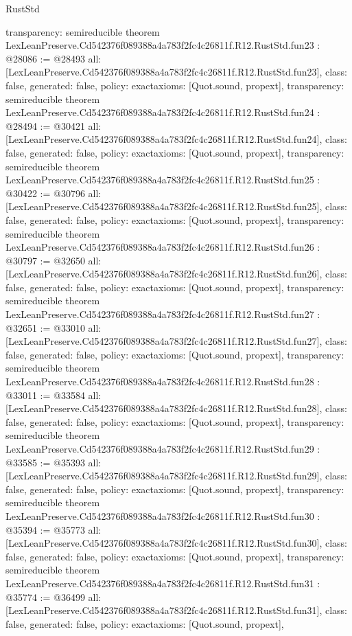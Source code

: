 \begin{lexlean}{RustStd}
\begin{coremodule}
{  transparency: semireducible
}
theorem LexLeanPreserve.Cd542376f089388a4a783f2fc4c26811f.R12.RustStd.fun23 : @28086 := @28493 {
  all: [LexLeanPreserve.Cd542376f089388a4a783f2fc4c26811f.R12.RustStd.fun23],
  class: false,
  generated: false,
  policy: exact{axioms: [Quot.sound, propext]},
  transparency: semireducible
}
theorem LexLeanPreserve.Cd542376f089388a4a783f2fc4c26811f.R12.RustStd.fun24 : @28494 := @30421 {
  all: [LexLeanPreserve.Cd542376f089388a4a783f2fc4c26811f.R12.RustStd.fun24],
  class: false,
  generated: false,
  policy: exact{axioms: [Quot.sound, propext]},
  transparency: semireducible
}
theorem LexLeanPreserve.Cd542376f089388a4a783f2fc4c26811f.R12.RustStd.fun25 : @30422 := @30796 {
  all: [LexLeanPreserve.Cd542376f089388a4a783f2fc4c26811f.R12.RustStd.fun25],
  class: false,
  generated: false,
  policy: exact{axioms: [Quot.sound, propext]},
  transparency: semireducible
}
theorem LexLeanPreserve.Cd542376f089388a4a783f2fc4c26811f.R12.RustStd.fun26 : @30797 := @32650 {
  all: [LexLeanPreserve.Cd542376f089388a4a783f2fc4c26811f.R12.RustStd.fun26],
  class: false,
  generated: false,
  policy: exact{axioms: [Quot.sound, propext]},
  transparency: semireducible
}
theorem LexLeanPreserve.Cd542376f089388a4a783f2fc4c26811f.R12.RustStd.fun27 : @32651 := @33010 {
  all: [LexLeanPreserve.Cd542376f089388a4a783f2fc4c26811f.R12.RustStd.fun27],
  class: false,
  generated: false,
  policy: exact{axioms: [Quot.sound, propext]},
  transparency: semireducible
}
theorem LexLeanPreserve.Cd542376f089388a4a783f2fc4c26811f.R12.RustStd.fun28 : @33011 := @33584 {
  all: [LexLeanPreserve.Cd542376f089388a4a783f2fc4c26811f.R12.RustStd.fun28],
  class: false,
  generated: false,
  policy: exact{axioms: [Quot.sound, propext]},
  transparency: semireducible
}
theorem LexLeanPreserve.Cd542376f089388a4a783f2fc4c26811f.R12.RustStd.fun29 : @33585 := @35393 {
  all: [LexLeanPreserve.Cd542376f089388a4a783f2fc4c26811f.R12.RustStd.fun29],
  class: false,
  generated: false,
  policy: exact{axioms: [Quot.sound, propext]},
  transparency: semireducible
}
theorem LexLeanPreserve.Cd542376f089388a4a783f2fc4c26811f.R12.RustStd.fun30 : @35394 := @35773 {
  all: [LexLeanPreserve.Cd542376f089388a4a783f2fc4c26811f.R12.RustStd.fun30],
  class: false,
  generated: false,
  policy: exact{axioms: [Quot.sound, propext]},
  transparency: semireducible
}
theorem LexLeanPreserve.Cd542376f089388a4a783f2fc4c26811f.R12.RustStd.fun31 : @35774 := @36499 {
  all: [LexLeanPreserve.Cd542376f089388a4a783f2fc4c26811f.R12.RustStd.fun31],
  class: false,
  generated: false,
  policy: exact{axioms: [Quot.sound, propext]},
}
\end{coremodule}
\end{lexlean}
